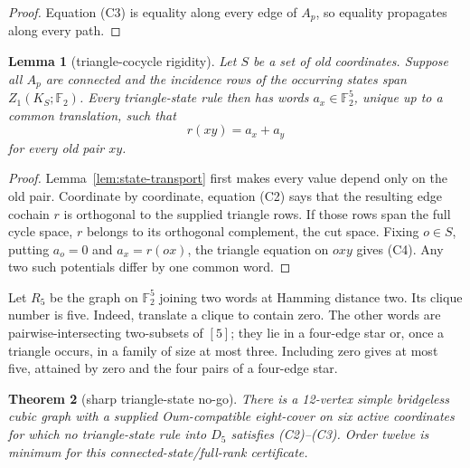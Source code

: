 \documentclass[11pt]{article}
\newtheorem{theorem}{Theorem}
\newtheorem{lemma}[theorem]{Lemma}
\theoremstyle{definition}
\theoremstyle{remark}
\newcommand{\F}{\mathbb F}
\begin{document}
\begin{proof}
Equation (C3) is equality along every edge of \(A_p\), so equality
propagates along every path.
\end{proof}

\begin{lemma}[triangle-cocycle rigidity]\label{lem:triangle-rigidity}
Let \(S\) be a set of old coordinates.  Suppose all \(A_p\) are connected
and the incidence rows of the occurring states span
\(Z_1(K_S;\F_2)\).  Every triangle-state rule then has words
\(a_x\in\F_2^5\), unique up to a common translation, such that
\[
                              r(xy)=a_x+a_y                   \tag{C4}
\]
for every old pair \(xy\).
\end{lemma}

\begin{proof}
Lemma~\ref{lem:state-transport} first makes every value depend only on the
old pair.  Coordinate by coordinate, equation (C2) says that the resulting
edge cochain \(r\) is orthogonal to the supplied triangle rows.  If those
rows span the full cycle space, \(r\) belongs to its orthogonal complement,
the cut space.  Fixing \(o\in S\), putting \(a_o=0\) and \(a_x=r(ox)\),
the triangle equation on \(oxy\) gives (C4).  Any two such potentials
differ by one common word.
\end{proof}

Let \(R_5\) be the graph on \(\F_2^5\) joining two words at Hamming
distance two.  Its clique number is five.  Indeed, translate a clique to
contain zero.  The other words are pairwise-intersecting two-subsets of
\([5]\); they lie in a four-edge star or, once a triangle occurs, in a
family of size at most three.  Including zero gives at most five, attained
by zero and the four pairs of a four-edge star.

\begin{theorem}[sharp triangle-state no-go]
\label{thm:triangle-state-no-go}
There is a 12-vertex simple bridgeless cubic graph with a supplied
Oum-compatible eight-cover on six active coordinates for which no
triangle-state rule into \(D_5\) satisfies \emph{(C2)}--\emph{(C3)}.
Order twelve is minimum for this connected-state/full-rank certificate.
\end{theorem}
\end{document}
